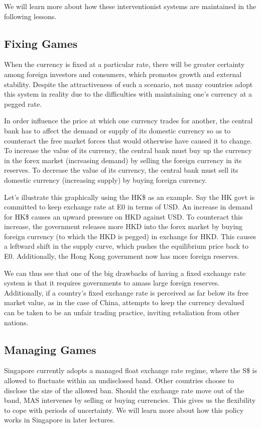 \documentclass[DIV=calc,11pt,parskip,numbers=noenddot]{scrartcl} %
\begin{document}
We will learn more about how these interventionist systems are maintained in the following lessons.
\subsection{Fixing Games}
When the currency is fixed at a particular rate, there will be greater certainty among foreign investors and consumers, which promotes growth and external stability. Despite the attractiveness of such a scenario, not many countries adopt this system in reality due to the difficulties with maintaining one’s currency at a pegged rate.

In order influence the price at which one currency trades for another, the central bank has to affect the demand or supply of its domestic currency so as to counteract the free market forces that would otherwise have caused it to change. To increase the value of its currency, the central bank must buy up the currency in the forex market (increasing demand) by selling the foreign currency in its reserves. To decrease the value of its currency, the central bank must sell its domestic currency (increasing supply) by buying foreign currency.

 Let’s illustrate this graphically using the HK\$ as an example. Say the HK govt is committed to keep exchange rate at E0 in terms of USD. An increase in demand for HK\$ causes an upward pressure on HKD against USD. To counteract this increase, the government releases more HKD into the forex market by buying foreign currency (to which the HKD is pegged) in exchange for HKD. This causes a leftward shift in the supply curve, which pushes the equilibrium price back to E0. Additionally, the Hong Kong government now has more foreign reserves.

We can thus see that one of the big drawbacks of having a fixed exchange rate system is that it requires governments to amass large foreign reserves. Additionally, if a country’s fixed exchange rate is perceived as far below its free market value, as in the case of China, attempts to keep the currency devalued can be taken to be an unfair trading practice, inviting retaliation from other nations.
\subsection{Managing Games}
Singapore currently adopts a managed float exchange rate regime, where the S\$ is allowed to fluctuate within an undisclosed band. Other countries choose to disclose the size of the allowed ban. Should the exchange rate move out of the band, MAS intervenes by selling or buying currencies. This gives us the flexibility to cope with periods of uncertainty. We will learn more about how this policy works in Singapore in later lectures.
\end{document}
